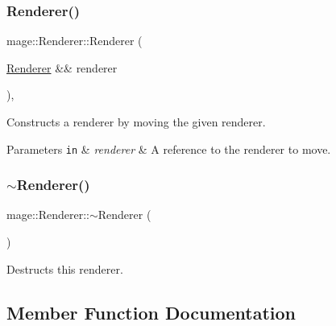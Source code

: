 \subsubsection{\texorpdfstring{Renderer()}{Renderer()}\hspace{0.1cm}{\footnotesize\ttfamily [3/3]}}
{\footnotesize\ttfamily mage\+::\+Renderer\+::\+Renderer (\begin{DoxyParamCaption}\item[{\hyperlink{classmage_1_1_renderer}{Renderer} \&\&}]{renderer }\end{DoxyParamCaption})\hspace{0.3cm}{\ttfamily [default]}, {\ttfamily [noexcept]}}

Constructs a renderer by moving the given renderer.


\begin{DoxyParams}[1]{Parameters}
\mbox{\tt in}  & {\em renderer} & A reference to the renderer to move. \\
\hline
\end{DoxyParams}
\hypertarget{classmage_1_1_renderer_a997e041f28cc71d069d1ab7d29fe6ced}{}\label{classmage_1_1_renderer_a997e041f28cc71d069d1ab7d29fe6ced} 
\subsubsection{\texorpdfstring{$\sim$\+Renderer()}{~Renderer()}}
{\footnotesize\ttfamily mage\+::\+Renderer\+::$\sim$\+Renderer (\begin{DoxyParamCaption}{ }\end{DoxyParamCaption})\hspace{0.3cm}{\ttfamily [default]}}

Destructs this renderer. 

\subsection{Member Function Documentation}
\hypertarget{classmage_1_1_renderer_a9c49991b051183c89308b81ff02eda35}{}\label{classmage_1_1_renderer_a9c49991b051183c89308b81ff02eda35} 
